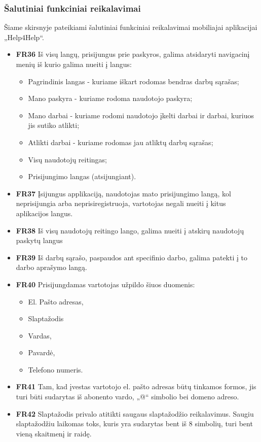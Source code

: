 \documentclass{VUMIFPSbakalaurinis}
\begin{document}
\subsubsection{Šalutiniai funkciniai reikalavimai}
Šiame skirsnyje pateikiami šalutiniai funkciniai reikalavimai mobiliajai aplikacijai „Help4Help“.
\begin{itemize}
	\item \textbf{FR36} Iš visų langų, prisijungus prie paskyros, galima atsidaryti navigacinį menių iš kurio galima nueiti į langus:
	\begin{itemize}
		\item Pagrindinis langas - kuriame iškart rodomas bendras darbų sąrašas;
		\item Mano paskyra - kuriame rodoma naudotojo paskyra;
		\item Mano darbai - kuriame rodomi naudotojo įkelti darbai ir darbai, kuriuos jis sutiko atlikti;
		\item Atlikti darbai - kuriame rodomas jau atliktų darbų sąrašas;
		\item Visų naudotojų reitingas;
		\item Prisijungimo langas (atsijungiant).
	\end{itemize}
	\item \textbf{FR37} Įsijungus applikaciją, naudotojas mato prisijungimo langą, kol neprisijungia arba neprisiregistruoja, vartotojas negali nueiti į kitus aplikacijos langus.
	\item \textbf{FR38} Iš visų naudotojų reitingo lango, galima nueiti į atskirų naudotojų paskytų langus
	\item \textbf{FR39} Iš darbų sąrašo, paspaudos ant specifinio darbo, galima patekti į to darbo aprašymo langą.
\end{itemize}

\begin{itemize}
	\item \textbf{FR40} Prisijungdamas vartotojas užpildo šiuos duomenis:
	\begin{itemize}
		\item El. Pašto adresas,
		\item Slaptažodis
		\item Vardas,
		\item Pavardė,
		\item Telefono numeris.
	\end{itemize}
	\item \textbf{FR41} Tam, kad įvestas vartotojo el. pašto adresas būtų tinkamos formos, jis turi būti sudarytas iš abonento vardo, „@“ simbolio bei domeno adreso.
	\item \textbf{FR42} Slaptažodis privalo atitikti saugaus slaptažodžio reikalavimus. Saugiu slaptažodžiu laikomas toks, kuris yra sudarytas bent iš 8 simbolių, turi bent vieną skaitmenį ir raidę.
\end{itemize}
\end{document}

